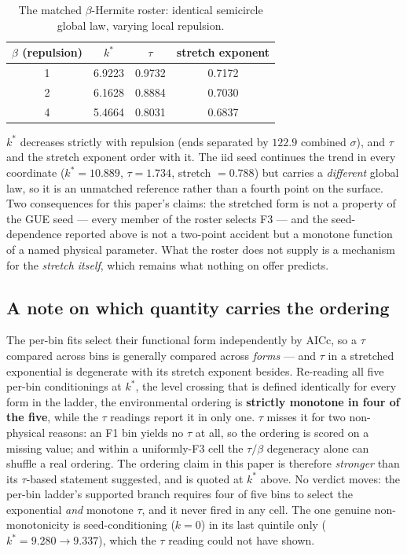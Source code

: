 \documentclass[11pt]{article}
\newcommand{\kstar}{k^{*}}
\begin{document}
\begin{table}[h]
\centering
\begin{tabular}{cccc}
\toprule
$\beta$ (repulsion) & $\kstar$ & $\tau$ & stretch exponent \\
\midrule
1 & 6.9223 & 0.9732 & 0.7172 \\
2 & 6.1628 & 0.8884 & 0.7030 \\
4 & 5.4664 & 0.8031 & 0.6837 \\
\bottomrule
\end{tabular}
\caption{The matched $\beta$-Hermite roster: identical semicircle global law, varying local
repulsion.}
\end{table}

$\kstar$ decreases strictly with repulsion (ends separated by $122.9$ combined $\sigma$), and
$\tau$ and the stretch exponent order with it. The iid seed continues the trend in every
coordinate ($\kstar=10.889$, $\tau=1.734$, stretch $=0.788$) but carries a \emph{different}
global law, so it is an unmatched reference rather than a fourth point on the surface. Two
consequences for this paper's claims: the stretched form is not a property of the GUE seed ---
every member of the roster selects F3 --- and the seed-dependence reported above is not a
two-point accident but a monotone function of a named physical parameter. What the roster does
not supply is a mechanism for the \emph{stretch itself}, which remains what nothing on offer
predicts.

\subsection*{A note on which quantity carries the ordering}
\label{sec:ordering}

The per-bin fits select their functional form independently by AICc, so a $\tau$ compared across
bins is generally compared across \emph{forms} --- and $\tau$ in a stretched exponential is
degenerate with its stretch exponent besides. Re-reading all five per-bin conditionings at
$\kstar$, the level crossing that is defined identically for every form in the ladder, the
environmental ordering is \textbf{strictly monotone in four of the five}, while the $\tau$
readings report it in only one. $\tau$ misses it for two non-physical reasons: an F1 bin yields
no $\tau$ at all, so the ordering is scored on a missing value; and within a uniformly-F3 cell
the $\tau/\beta$ degeneracy alone can shuffle a real ordering. The ordering claim in this paper
is therefore \emph{stronger} than its $\tau$-based statement suggested, and is quoted at $\kstar$
above. No verdict moves: the per-bin ladder's supported branch requires four of five bins to
select the exponential \emph{and} monotone $\tau$, and it never fired in any cell. The one
genuine non-monotonicity is seed-conditioning ($k=0$) in its last quintile only
($\kstar=9.280\to9.337$), which the $\tau$ reading could not have shown.
\end{document}
